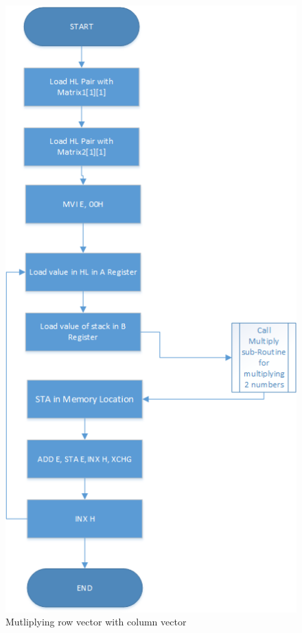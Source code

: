 \documentclass[12pt]{article}
\begin{document}
\begin{multicols}{2}
\begin{figure}[H]
\end{figure}
\begin{figure}[H]
\centering
\includegraphics[scale = 0.55]{Multiplication.png}
\caption{Mutliplying row vector with column vector}
\label{fig:figure2}

\end{figure}

\end{multicols}
\end{document}

